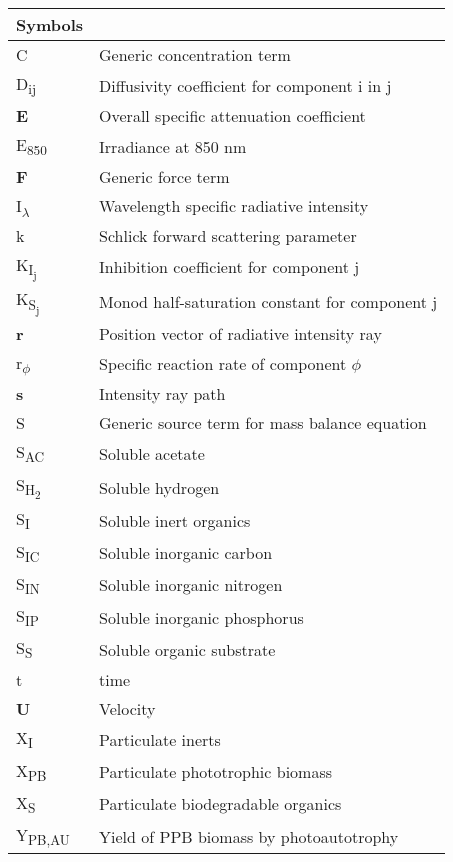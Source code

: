 \begin{center}
	\small
	\begin{longtable}{ll}
	\toprule
	Symbols & {} \\
	\bottomrule
	C	&	Generic concentration term	\\
D\textsubscript{ij}	&	Diffusivity coefficient for component i in j	\\
\textbf{E}	&	Overall specific attenuation coefficient	\\
E\textsubscript{850}	&	Irradiance at 850 nm	\\
\textbf{F}	&	Generic force term	\\
I\textsubscript{$\lambda$}	&	Wavelength specific radiative intensity	\\
k	&	Schlick forward scattering parameter	\\
K\textsubscript{I\textsubscript{j}}	&	Inhibition coefficient for component j	\\
K\textsubscript{S\textsubscript{j}}	&	Monod half-saturation constant for component j	\\
\textbf{r}	&	Position vector of radiative intensity ray	\\
r\textsubscript{$\phi$}	&	Specific reaction rate of component $\phi$	\\
\textbf{s}	&	Intensity ray path	\\
S	&	Generic source term for mass balance equation	\\
S\textsubscript{AC}	&	Soluble acetate	\\
S\textsubscript{H\textsubscript{2}}	&	Soluble hydrogen	\\
S\textsubscript{I}	&	Soluble inert organics	\\
S\textsubscript{IC}	&	Soluble inorganic carbon	\\
S\textsubscript{IN}	&	Soluble inorganic nitrogen	\\
S\textsubscript{IP}	&	Soluble inorganic phosphorus	\\
S\textsubscript{S}	&	Soluble organic substrate	\\
t	&	time	\\
\textbf{U}	&	Velocity	\\
X\textsubscript{I}	&	Particulate inerts	\\
X\textsubscript{PB}	&	Particulate phototrophic biomass	\\
X\textsubscript{S}	&	Particulate biodegradable organics	\\
Y\textsubscript{PB,AU}	&	Yield of PPB biomass by photoautotrophy	\\

\end{longtable}
\end{center}
